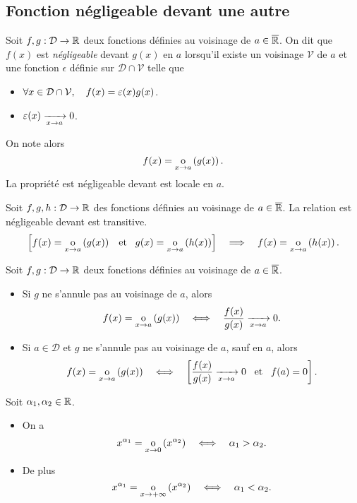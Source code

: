 \documentclass{magnoliaold}
\begin{document}
\subsection{Fonction négligeable devant une autre}

\begin{definition}[utile=-3]
Soit $f,g:\mathcal{D}\to\mathbb{R}$ deux fonctions définies au voisinage de $a\in\overline{\mathbb{R}}$. On dit
que $f(x)$ est \emph{négligeable} devant $g(x)$ en $a$ lorsqu'il existe un voisinage $\mathcal{V}$ de $a$ et une fonction $\epsilon$ définie sur $\mathcal{D}\cap\mathcal{V}$ telle que
\begin{itemize}
\item $\forall x\in\mathcal{D}\cap\mathcal{V},\quad f(x)=\varepsilon(x)g(x)$.
\item $\varepsilon(x)\xrightarrow[x\rightarrow a]{}0$.
\end{itemize}
On note alors
\[f(x)=\underset{x \rightarrow a}{\text{o}}\left(g(x)\right).\]
La propriété \og est négligeable devant \fg est locale en $a$.
\end{definition}

\begin{proposition}[utile=-3]
Soit $f,g,h:\mathcal{D}\to\mathbb{R}$ des fonctions définies au voisinage de $a\in\overline{\mathbb{R}}$. La relation
\og est négligeable devant \fg est transitive.
\[\left[f(x)=\underset{x \rightarrow a}{\text{o}}\left(g(x)\right) \quad\!\text{et}\quad\! g(x)=\underset{x \rightarrow a}{\text{o}}\left(h(x)\right)\right]\quad\Longrightarrow\quad
    f(x)=\underset{x \rightarrow a}{\text{o}}\left(h(x)\right).\]
\end{proposition}

\begin{proposition}[utile=-3]
Soit $f,g:\mathcal{D}\to\mathbb{R}$ deux fonctions définies au voisinage de $a\in\overline{\mathbb{R}}$.
\begin{itemize}
\item Si $g$ ne s'annule pas au voisinage de $a$, alors
  \[f(x)=\underset{x \rightarrow a}{\text{o}}\left(g(x)\right) \quad\Longleftrightarrow\quad
    \frac{f(x)}{g(x)}\xrightarrow[x\rightarrow a]{} 0.\]
\item Si $a\in\mathcal{D}$ et $g$ ne s'annule pas au voisinage de $a$, sauf en $a$, alors
  \[f(x)=\underset{x \rightarrow a}{\text{o}}\left(g(x)\right) \quad\Longleftrightarrow\quad
    \left[\frac{f(x)}{g(x)}\xrightarrow[x\rightarrow a]{} 0 \quad\!\text{et}\quad\! f(a)=0\right].\]
\end{itemize}
\end{proposition}

\begin{proposition}[utile=-3]
Soit $\alpha_1,\alpha_2\in\mathbb{R}$.
\begin{itemize}
\item On a
  \[x^{\alpha_1}=\underset{x \rightarrow 0}{\text{o}}\left(x^{\alpha_2}\right) \quad\Longleftrightarrow\quad \alpha_1 > \alpha_2.\]
\item De plus
  \[x^{\alpha_1}=\underset{x \rightarrow +\infty}{\text{o}}\left(x^{\alpha_2}\right) \quad\Longleftrightarrow\quad
    \alpha_1 < \alpha_2.\]
\end{itemize}
\end{proposition}
\end{document}
